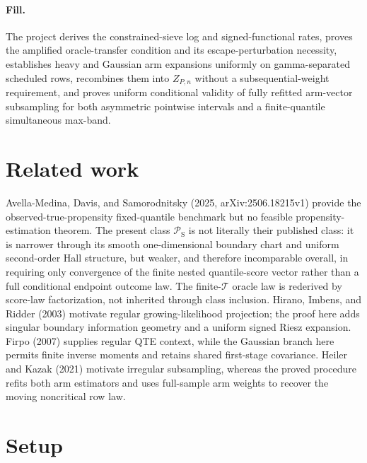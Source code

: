 \documentclass{article}
\begin{document}
\paragraph{Fill.} The project derives the constrained-sieve log and signed-functional rates, proves the amplified oracle-transfer condition and its escape-perturbation necessity, establishes heavy and Gaussian arm expansions uniformly on gamma-separated scheduled rows, recombines them into \(Z_{P,n}\) without a subsequential-weight requirement, and proves uniform conditional validity of fully refitted arm-vector subsampling for both asymmetric pointwise intervals and a finite-quantile simultaneous max-band.

\section{Related work}

Avella-Medina, Davis, and Samorodnitsky (2025, arXiv:2506.18215v1) provide the observed-true-propensity fixed-quantile benchmark but no feasible propensity-estimation theorem. The present class \(\mathcal P_{\mathrm S}\) is not literally their published class: it is narrower through its smooth one-dimensional boundary chart and uniform second-order Hall structure, but weaker, and therefore incomparable overall, in requiring only convergence of the finite nested quantile-score vector rather than a full conditional endpoint outcome law. The finite-\(\mathcal T\) oracle law is rederived by score-law factorization, not inherited through class inclusion. Hirano, Imbens, and Ridder (2003) motivate regular growing-likelihood projection; the proof here adds singular boundary information geometry and a uniform signed Riesz expansion. Firpo (2007) supplies regular QTE context, while the Gaussian branch here permits finite inverse moments and retains shared first-stage covariance. Heiler and Kazak (2021) motivate irregular subsampling, whereas the proved procedure refits both arm estimators and uses full-sample arm weights to recover the moving noncritical row law.

\section{Setup}
\end{document}
